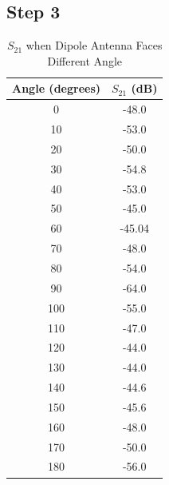 \documentclass{article} %
\begin{document}
\subsection*{Step 3}

\begin{table}[h!]
    \centering
    \begin{tabular}{|c|c|}
        \hline
        \textbf{Angle (degrees)} & \textbf{$S_{21}$ (dB)} \\
        \hline
        0                        & -48.0                  \\
        10                       & -53.0                  \\
        20                       & -50.0                  \\
        30                       & -54.8                  \\
        40                       & -53.0                  \\
        50                       & -45.0                  \\
        60                       & -45.04                 \\
        70                       & -48.0                  \\
        80                       & -54.0                  \\
        90                       & -64.0                  \\
        100                      & -55.0                  \\
        110                      & -47.0                  \\
        120                      & -44.0                  \\
        130                      & -44.0                  \\
        140                      & -44.6                  \\
        150                      & -45.6                  \\
        160                      & -48.0                  \\
        170                      & -50.0                  \\
        180                      & -56.0                  \\
        \hline
    \end{tabular}
    \caption{$S_{21}$ when Dipole Antenna Faces Different Angle}
\end{table}
\end{document}
